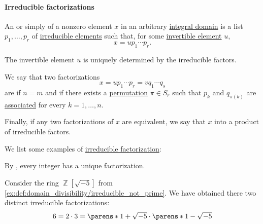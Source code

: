 \paragraph{Irreducible factorizations}

\begin{definition}\label{def:irreducible_factorization}
  An  or simply  of a nonzero element \( x \) in an arbitrary \hyperref[def:integral_domain]{integral domain} is a list \( p_1, \ldots, p_r \) of \hyperref[def:domain_divisibility/irreducible]{irreducible elements} such that, for some \hyperref[def:semiring_divisibility/invertible]{invertible element} \( u \),
  \begin{equation*}
    x = u p_1 \cdots p_r.
  \end{equation*}

  The invertible element \( u \) is uniquely determined by the irreducible factors.

  \begin{thmenum}
     We say that two factorizations
    \begin{equation*}
      x = u p_1 \cdots p_r = v q_1 \cdots q_s
    \end{equation*}
    are  if \( n = m \) and if there exists a \hyperref[def:symmetric_group]{permutation} \( \pi \in S_r \) such that \( p_k \) and \( q_{\pi(k)} \) are \hyperref[def:domain_divisibility/associates]{associated} for every \( k = 1, \ldots, n \).

     Finally, if any two factorizations of \( x \) are equivalent, we say that \( x \)  into a product of irreducible factors.
  \end{thmenum}
\end{definition}

\begin{example}\label{ex:def:irreducible_factorization}
  We list some examples of \hyperref[def:irreducible_factorization]{irreducible factorization}:
  \begin{thmenum}
     By , every integer has a unique factorization.

     Consider the ring \( \BbbZ[\sqrt{-5}] \) from \cref{ex:def:domain_divisibility/irreducible_not_prime}. We have obtained there two distinct irreducible factorizations:
    \begin{equation*}
      6 = 2 \cdot 3 = \parens*{ 1 + \sqrt{-5} } \cdot \parens*{ 1 - \sqrt{-5}}
    \end{equation*}
  \end{thmenum}
\end{example}

